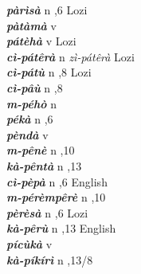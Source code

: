 \begin{multicols}{2}
{{\bfseries\itshape pàrìsà}} \relax  n  ,6  \relax  Lozi \relax  \\
{{\bfseries\itshape pàtàmà}} \relax  v  \relax   {} \relax   \relax  \\
{{\bfseries\itshape pátèhà}} \relax  v  \relax   \relax  {} \relax  Lozi \relax  \\
{{\bfseries\itshape cì-pátêrà}} \relax  n   \relax  \textit{zì-pátêrà} \relax  Lozi\\
{{\bfseries\itshape cì-pátù}} \relax  n  ,8  \relax  Lozi \relax  \\
{{\bfseries\itshape cì-pâù}} \relax  n  ,8  \relax   \relax  \\
{{\bfseries\itshape m-péhò}} \relax  n   \relax  {} \relax   \relax  \\
{{\bfseries\itshape pékà}} \relax  n  ,6  \relax   \relax  \\
{{\bfseries\itshape pèndà}} \relax  v  \relax   \relax  {} \relax   \relax  \\
{{\bfseries\itshape m-pênè}} \relax  n  ,10  \relax   \relax  \\
{{\bfseries\itshape kà-pêntà}} \relax  n  ,13  \relax   \relax  \\
{{\bfseries\itshape cì-pèpà}} \relax  n  ,6  \relax  English \relax  \\
{{\bfseries\itshape m-pérèmpêrè}} \relax  n  ,10  \relax   \relax  \\
{{\bfseries\itshape pèrèsà}} \relax  n  ,6  \relax  Lozi \relax  \\
{{\bfseries\itshape kà-pêrù}} \relax  n  ,13  \relax  English \relax  \\
{{\bfseries\itshape pícùkà}} \relax  v  \relax   \relax  {} \relax   \relax  \\
{{\bfseries\itshape kà-píkírì}} \relax  n  ,13/8 
\end{multicols}
